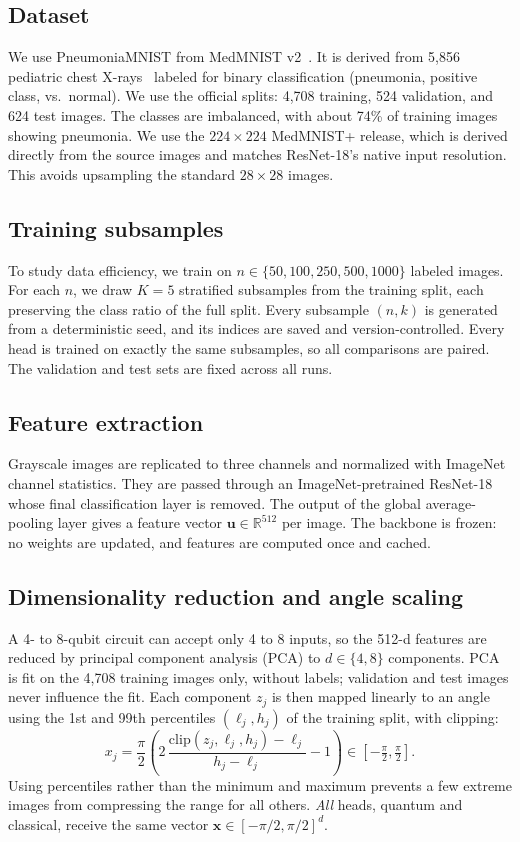 \documentclass[conference]{IEEEtran}
\begin{document}
\subsection{Dataset}
We use PneumoniaMNIST from MedMNIST v2~\cite{yang2023}. It is derived from
5{,}856 pediatric chest X-rays~\cite{kermany2018} labeled for binary
classification (pneumonia, positive class, vs.\ normal). We use the official
splits: 4{,}708 training, 524 validation, and 624 test images. The classes
are imbalanced, with about 74\% of training images showing pneumonia. We
use the $224\times224$ MedMNIST+ release, which is derived directly from the
source images and matches ResNet-18's native input resolution. This avoids
upsampling the standard $28\times28$ images.

\subsection{Training subsamples}
\label{sec:folds}
To study data efficiency, we train on $n\in\{50,100,250,500,1000\}$
labeled images. For each $n$, we draw $K=5$ stratified subsamples from the
training split, each preserving the class ratio of the full split. Every
subsample $(n,k)$ is generated from a deterministic seed, and its indices
are saved and version-controlled. Every head is trained on exactly the same
subsamples, so all comparisons are paired. The validation and test sets are
fixed across all runs.

\subsection{Feature extraction}
Grayscale images are replicated to three channels and normalized with
ImageNet channel statistics. They are passed through an ImageNet-pretrained
ResNet-18~\cite{he2016} whose final classification layer is removed. The
output of the global average-pooling layer gives a feature vector
$\mathbf{u}\in\mathbb{R}^{512}$ per image. The backbone is frozen: no
weights are updated, and features are computed once and cached.

\subsection{Dimensionality reduction and angle scaling}
A 4- to 8-qubit circuit can accept only 4 to 8 inputs, so the 512-d
features are reduced by principal component analysis (PCA) to
$d\in\{4,8\}$ components. PCA is fit on the 4{,}708 training images only,
without labels; validation and test images never influence the fit. Each
component $z_j$ is then mapped linearly to an angle using the 1st and 99th
percentiles $(\ell_j,h_j)$ of the training split, with clipping:
\begin{equation}
x_j=\frac{\pi}{2}\left(2\,\frac{\mathrm{clip}(z_j,\ell_j,h_j)-\ell_j}{h_j-\ell_j}-1\right)
\in\left[-\tfrac{\pi}{2},\tfrac{\pi}{2}\right].
\end{equation}
Using percentiles rather than the minimum and maximum prevents a few
extreme images from compressing the range for all others. \emph{All} heads,
quantum and classical, receive the same vector
$\mathbf{x}\in[-\pi/2,\pi/2]^d$.
\end{document}
